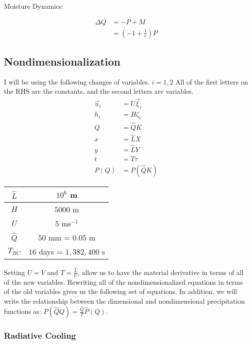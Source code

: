 \documentclass[10pt]{article}
\begin{document}
Moisture Dynamics:

\begin{align}
\Delta Q &= -P + M\\
&= \left(-1 + \frac{1}{\epsilon} \right)P
\label{DMoi}
\end{align}

\subsection{Nondimensionalization}
I will be using the following changes of variables. $i=1,2$ All of the first letters on the RHS are the constants, and the second letters are variables. 
\begin{align}
\vec{u}_i &= U \vec{\xi}_i\\
h_i &= H \zeta_i\\
Q &= \hat{Q} K \\
x &= \hat{L}X \\
y &= \hat{L}Y \\
t &= T \tau \\
P(Q) &= P (\hat{Q}K)
\end{align}
 
 \begin{center}
 	\begin{tabular}{ |c|c| } 
 		\hline
 		$\hat{L}$ & $10^6$ m \\ \hline
 		$H$ & $5000$ m \\ \hline
 		$U$ & $5$ ms$^{-1}$ \\ \hline
 		$\hat{Q}$ & $50$ mm = $0.05$ m \\ \hline
 		$T_{RC}$ & $16$ days = $1,382,400$ s \\ \hline
 	\end{tabular}
 \end{center}

Setting $U=V$ and $T=\frac{\hat{L}}{U}$, allow us to have the material derivative in terms of all of the new variables. Rewriting all of the nondimensionalized equations in terms of the old variables gives us the following set of equations. In addition, we will write the relationship between the dimensional and nondimensional precipitation functions as: $P(\hat{Q}Q) = \frac{\hat{Q}}{T}\hat{P}(Q)$. 

\subsubsection{Radiative Cooling}
\end{document}
